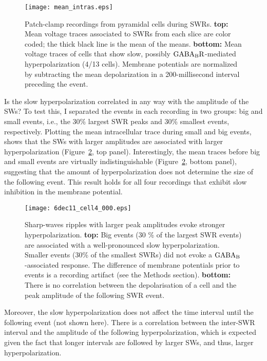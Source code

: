    \begin{figure}
      \center
      \texttt{[image: mean\_intras.eps]}
      \caption{ 
        Patch-clamp recordings from pyramidal cells during SWRs. {\bf top:}
        Mean voltage traces associated to SWRs from each slice are color coded;
        the thick black line is the mean of the means. {\bf bottom:} Mean
        voltage traces of cells that show slow, possibly $\rm GABA_BR$-mediated
        hyperpolarization (4/13 cells). Membrane potentials are normalized by
        subtracting the mean depolarization in a 200-millisecond interval
        preceding the event.
              }
      \label{fig:intra_means}
    \end{figure}

    Is the slow hyperpolarization correlated in any way with the amplitude of
    the SWs? To test this, I separated the events in each recording in two
    groups: big and small events, i.e., the 30\% largest SWR peaks and 30\%
    smallest events, respectively. Plotting the mean intracellular trace during
    small and big events, shows that the SWs with larger amplitudes are
    associated with larger hyperpolarization (Figure~\ref{fig:intra_big_small},
    top panel). Interestingly, the mean traces before big and small events are
    virtually indistinguishable (Figure~\ref{fig:intra_big_small}, bottom
    panel), suggesting that the amount of hyperpolarization does not determine the size
    of the following event. This result holds for all four recordings that
    exhibit slow inhibition in the membrane potential.
    
    \begin{figure}
      \center
      \texttt{[image: 6dec11\_cell4\_000.eps]}
      \caption{ 
        Sharp-waves ripples with larger peak amplitudes evoke stronger
        hyperpolarization. {\bf top:} Big events (30 \% of the largest SWR
        events) are associated with a well-pronounced slow hyperpolarization.
        Smaller events (30\% of the smallest SWRs) did not evoke a $\rm
        GABA_B$-associated response. The difference of membrane potentials
        prior to events is a recording artifact (see the Methods section). {\bf
        bottom:} There is no correlation between the depolarisation of a cell
        and the peak amplitude of the following SWR event.
              }
      \label{fig:intra_big_small}
    \end{figure}

    Moreover, the slow hyperpolarization does not affect the time interval
    until the following event (not shown here). There is a correlation between
    the inter-SWR interval and the amplitude of the following hyperpolarization,
    which is expected given the fact that longer intervals are followed by
    larger SWs, and thus, larger hyperpolarization.

